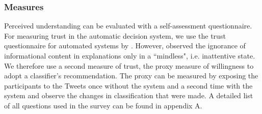 \subsubsection{Measures}
Perceived understanding can be evaluated with a self-assessment questionnaire.\newline
For measuring trust in the automatic decision system, we use the trust questionnaire for automated systems by \cite{ruping2006learning}. However, \cite{langer1978mindlessness} observed the ignorance of informational content in explanations only in a ``mindless", i.e. inattentive state. We therefore use a second measure of trust, the proxy measure of willingness to adopt a classifier's recommendation. The proxy can be measured by exposing the participants to the Tweets once without the system and a second time with the system and observe the changes in classification that were made. A detailed list of all questions used in the survey can be found in appendix A.

